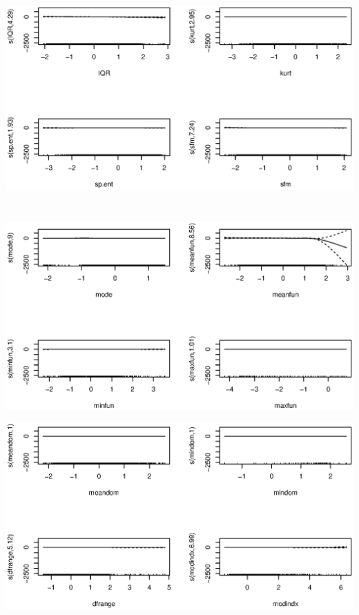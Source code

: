 \documentclass{article}%
\begin{document}
\includegraphics[width = \textwidth, height = 8.5cm]{Rplot_gam_2.eps}

\includegraphics[width = \textwidth]{Rplot_gam_3.eps}

\includegraphics[width = \textwidth]{Rplot_gam_4.eps}
\end{document}
